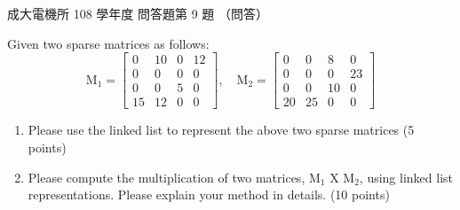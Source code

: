 \begin{pastexam}[label={px:ncku-108-ee-ds-10}]{成大電機所 108 學年度 問答題第 9 題}
（問答）

Given two sparse matrices as follows:
\[
\mathrm{M}_1=\begin{bmatrix}0&10&0&12\\0&0&0&0\\0&0&5&0\\15&12&0&0\end{bmatrix},\quad
\mathrm{M}_2=\begin{bmatrix}0&0&8&0\\0&0&0&23\\0&0&10&0\\20&25&0&0\end{bmatrix}
\]
\begin{enumerate}[label=(\Alph*)]
\item Please use the linked list to represent the above two sparse matrices (5 points)
\item Please compute the multiplication of two matrices, M$_1$ X M$_2$, using linked list
representations. Please explain your method in details. (10 points)
\end{enumerate}
\end{pastexam}

